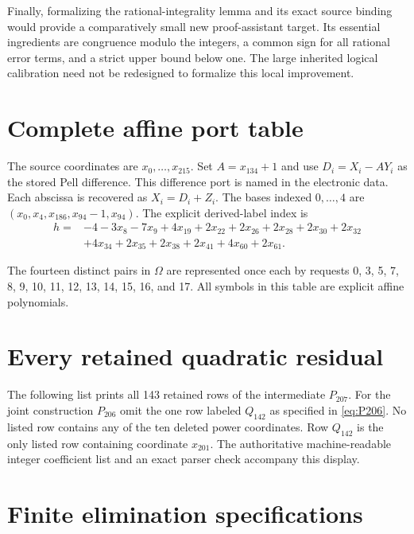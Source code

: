 \documentclass[11pt]{article}
\theoremstyle{definition}\newtheorem{definition}[theorem]{Definition}
\newcommand{\code}[1]{\texttt{\detokenize{#1}}}
\begin{document}
Finally, formalizing the rational-integrality lemma and its exact source
binding would provide a comparatively small new proof-assistant target.
Its essential ingredients are congruence modulo the integers, a common
sign for all rational error terms, and a strict upper bound below one.
The large inherited logical calibration need not be redesigned to
formalize this local improvement.

\appendix
\section{Complete affine port table}\label{app:ports}

The source coordinates are $x_0,\ldots,x_{215}$. Set $A=x_{134}+1$ and
use $D_i=X_i-AY_i$ as the stored Pell difference. This difference port
is named \code{D} in the electronic data. Each abscissa is recovered as
$X_i=D_i+Z_i$.
The bases indexed $0,\ldots,4$ are
$(x_0,x_4,x_{186},x_{94}-1,x_{94})$.
The explicit derived-label index is
\begin{align*}
 h={}&-4-3x_8-7x_9+4x_{19}+2x_{22}+2x_{26}+2x_{28}+2x_{30}+2x_{32}\\
 &+4x_{34}+2x_{35}+2x_{38}+2x_{41}+4x_{60}+2x_{61}.
\end{align*}

The fourteen distinct pairs in $\Omega$ are represented once each by
requests 0, 3, 5, 7, 8, 9, 10, 11, 12, 13, 14, 15, 16, and 17.
All symbols in this table are explicit affine polynomials.

\section{Every retained quadratic residual}\label{app:rows}

The following list prints all 143 retained rows of the intermediate
$P_{207}$. For the joint construction $P_{206}$ omit the one row labeled
$Q_{142}$ as specified in \eqref{eq:P206}. No listed row contains any of
the ten deleted power coordinates. Row $Q_{142}$ is the only listed
row containing coordinate $x_{201}$. The authoritative machine-readable
integer coefficient list and an exact parser check accompany this display.



\section{Finite elimination specifications}\label{app:pivots}
\end{document}
